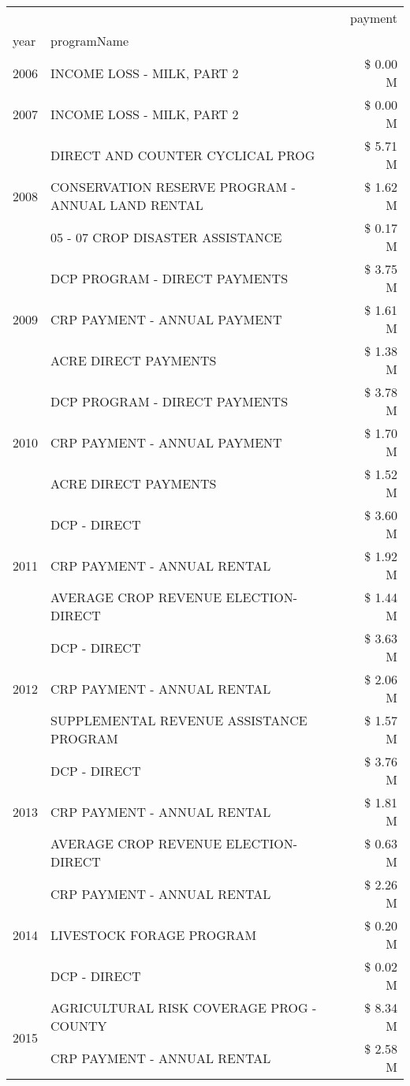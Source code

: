 \begin{tabular}{llr}
\toprule
 &  & payment \\
year & programName &  \\
\midrule
2006 & INCOME LOSS - MILK, PART 2 & \$ 0.00 M \\
\cline{1-3}
2007 & INCOME LOSS - MILK, PART 2 & \$ 0.00 M \\
\cline{1-3}
\multirow[t]{3}{*}{2008} & DIRECT AND COUNTER CYCLICAL PROG & \$ 5.71 M \\
 & CONSERVATION RESERVE PROGRAM - ANNUAL LAND RENTAL & \$ 1.62 M \\
 & 05 - 07 CROP DISASTER ASSISTANCE & \$ 0.17 M \\
\cline{1-3}
\multirow[t]{3}{*}{2009} & DCP PROGRAM - DIRECT PAYMENTS & \$ 3.75 M \\
 & CRP PAYMENT - ANNUAL PAYMENT & \$ 1.61 M \\
 & ACRE DIRECT PAYMENTS & \$ 1.38 M \\
\cline{1-3}
\multirow[t]{3}{*}{2010} & DCP PROGRAM - DIRECT PAYMENTS & \$ 3.78 M \\
 & CRP PAYMENT - ANNUAL PAYMENT & \$ 1.70 M \\
 & ACRE DIRECT PAYMENTS & \$ 1.52 M \\
\cline{1-3}
\multirow[t]{3}{*}{2011} & DCP - DIRECT & \$ 3.60 M \\
 & CRP PAYMENT - ANNUAL RENTAL & \$ 1.92 M \\
 & AVERAGE CROP REVENUE ELECTION-DIRECT & \$ 1.44 M \\
\cline{1-3}
\multirow[t]{3}{*}{2012} & DCP - DIRECT & \$ 3.63 M \\
 & CRP PAYMENT - ANNUAL RENTAL & \$ 2.06 M \\
 & SUPPLEMENTAL REVENUE ASSISTANCE PROGRAM & \$ 1.57 M \\
\cline{1-3}
\multirow[t]{3}{*}{2013} & DCP - DIRECT & \$ 3.76 M \\
 & CRP PAYMENT - ANNUAL RENTAL & \$ 1.81 M \\
 & AVERAGE CROP REVENUE ELECTION-DIRECT & \$ 0.63 M \\
\cline{1-3}
\multirow[t]{3}{*}{2014} & CRP PAYMENT - ANNUAL RENTAL & \$ 2.26 M \\
 & LIVESTOCK FORAGE PROGRAM & \$ 0.20 M \\
 & DCP - DIRECT & \$ 0.02 M \\
\cline{1-3}
\multirow[t]{3}{*}{2015} & AGRICULTURAL RISK COVERAGE PROG - COUNTY & \$ 8.34 M \\
 & CRP PAYMENT - ANNUAL RENTAL & \$ 2.58 M \\

\end{tabular}
